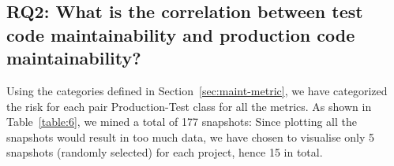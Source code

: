 
\subsection*{RQ2: What is the correlation between test code maintainability and production code maintainability?}
\label{maintainability:correlation}
Using the categories defined in Section~\ref{sec:maint-metric}, we have categorized the risk for each pair Production-Test class for all the metrics. As shown in Table~\ref{table:6}, we mined a total of 177 snapshots: Since plotting all the snapshots would result in too much data, we have chosen to visualise only 5 snapshots (randomly selected) for each project, hence 15 in total. 

